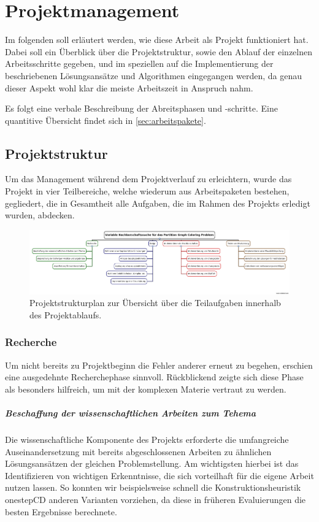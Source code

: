 \chapter{Projektmanagement}

Im folgenden soll erläutert werden, wie diese Arbeit als Projekt funktioniert hat. Dabei soll ein Überblick über die Projektstruktur, sowie den Ablauf der einzelnen Arbeitsschritte gegeben, und im speziellen auf die Implementierung der beschriebenen Lösungsansätze und Algorithmen eingegangen werden, da genau dieser Aspekt wohl klar die meiste Arbeitszeit in Anspruch nahm.

Es folgt eine verbale Beschreibung der Abreitsphasen und -schritte. Eine quantitive Übersicht findet sich in \ref{sec:arbeitspakete}.

\section{Projektstruktur}

Um das Management während dem Projektverlauf zu erleichtern, wurde das Projekt in vier Teilbereiche, welche wiederum aus Arbeitspaketen bestehen, gegliedert, die in Gesamtheit alle Aufgaben, die im Rahmen des Projekts erledigt wurden, abdecken.

\begin{figure}
\centering
\includegraphics[angle=90, height=0.9\textheight]{img/psp.png}
\caption[Projektstrukturplan]{Projektstrukturplan zur Übersicht über die Teilaufgaben innerhalb des Projektablaufs.}
\label{fig:psp}
\end{figure}

\subsection{Recherche}

Um nicht bereits zu Projektbeginn die Fehler anderer erneut zu begehen, erschien eine ausgedehnte Recherchephase sinnvoll. Rückblickend zeigte sich diese Phase als besonders hilfreich, um mit der komplexen Materie vertraut zu werden.

\paragraph{Beschaffung der wissenschaftlichen Arbeiten zum Tehema}{Die wissenschaftliche Komponente des Projekts erforderte die umfangreiche Auseinandersetzung mit bereits abgeschlossenen Arbeiten zu ähnlichen Lösungsansätzen der gleichen Problemstellung. Am wichtigsten hierbei ist das Identifizieren von wichtigen Erkenntnisse, die sich vorteilhaft für die eigene Arbeit nutzen lassen. So konnten wir beispielsweise schnell die Konstruktionsheuristik onestepCD anderen Varianten vorziehen, da diese in früheren Evaluierungen die besten Ergebnisse berechnete.} %


